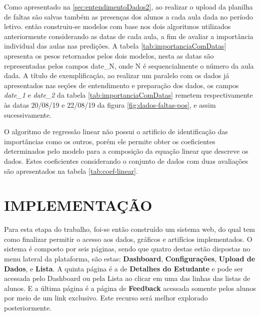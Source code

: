 Como apresentado na \ref{sec:entendimentoDados2}, ao realizar o upload da planilha de faltas são salvas também as presenças dos alunos a cada aula dada no período letivo. então construiu-se modelos com base nos dois algoritmos utilizados anteriormente considerando as datas de cada aula, a fim de avaliar a importância individual das aulas nas predições. 
A tabela \ref{tab:importanciaComDatas} apresenta os pesos retornados pelos dois modelos, nesta as datas são representadas pelos campos date\_N, onde N é sequencialmente o número da aula dada. 
A título de exemplificação, ao realizar um paralelo com os dados já apresentados nas seções de entendimento e preparação dos dados, os campos \textit{date\_1} e \textit{date\_2} da tabela \ref{tab:importanciaComDatas} remetem respectivamente às datas 20/08/19 e 22/08/19 da figura \ref{fig:dados-faltas-pos}, e assim sucessivamente.



O algoritmo de regressão linear não possui o artificio de identificação das importâncias como os outros, porém ele permite obter os coeficientes determinados pelo modelo para a composição da equação linear que descreve os dados.
Estes coeficientes considerando o conjunto de dados com duas avaliações são apresentados na tabela \ref{tab:coef-linear}.




\section{IMPLEMENTAÇÃO}
\label{sec:implementacao}

Para esta etapa do trabalho, foi-se então construído um sistema web, do qual tem como finalizar permitir o acesso aos dados, gráficos e artifícios implementados.
O sistema é composto por seis páginas, sendo que quatro destas estão dispostas no menu lateral da plataforma, são estas: \textbf{Dashboard}, \textbf{Configurações}, \textbf{Upload de Dados},  e \textbf{Lista}.
A quinta página é a de \textbf{Detalhes do Estudante} e pode ser acessada pelo Dashboard ou pela Lista ao clicar em uma das linhas das listas de alunos. 
E a última página é a página de \textbf{Feedback} acessada somente pelos alunos por meio de um link exclusivo. Este recurso será melhor explorado posteriormente.

